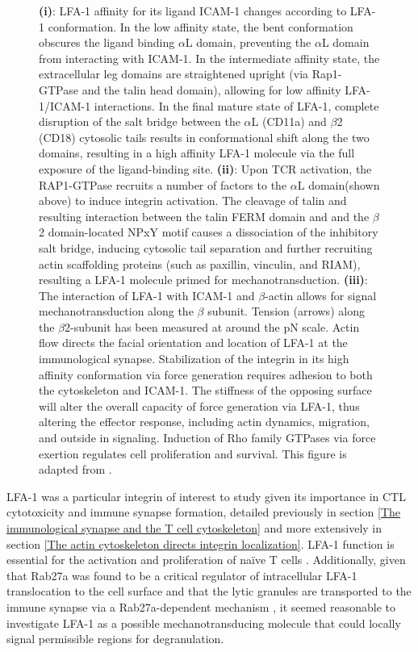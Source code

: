 \begin{figure}[htbp]
	\caption*{\textbf{(i)}: LFA-1 affinity for its ligand ICAM-1 changes according to LFA-1 conformation. In the low affinity state, the bent conformation obscures the ligand binding $\alpha$L domain, preventing the $\alpha$L domain from interacting with ICAM-1. In the intermediate affinity state, the extracellular leg domains are straightened upright (via Rap1-GTPase and the talin head domain), allowing for low affinity LFA-1/ICAM-1 interactions. In the final mature state of LFA-1, complete disruption of the salt bridge between the $\alpha$L (CD11a) and $\beta$2 (CD18) cytosolic tails results in conformational shift along the two domains, resulting in a high affinity LFA-1 molecule via the full exposure of the ligand-binding site. \textbf{(ii)}: Upon TCR activation, the RAP1-GTPase recruits a number of factors to the $\alpha$L domain(shown above) to induce integrin activation. The cleavage of talin and resulting interaction between the talin FERM domain and and the $\beta$2 domain-located NPxY motif causes a dissociation of the inhibitory salt bridge, inducing cytosolic tail separation and  further recruiting actin scaffolding proteins (such as paxillin, vinculin, and RIAM), resulting a LFA-1 molecule primed for mechanotransduction. \textbf{(iii)}: The interaction of LFA-1 with ICAM-1 and $\beta$-actin allows for signal mechanotransduction along the $\beta$ subunit. Tension (arrows) along the $\beta$2-subunit has been measured at around the pN scale. Actin flow directs the facial orientation and location of LFA-1 at the immunological synapse. Stabilization of the integrin in its high affinity conformation via force generation requires adhesion to both the cytoskeleton and ICAM-1. The stiffness of the opposing surface will alter the overall capacity of force generation via LFA-1, thus altering the effector response, including actin dynamics, migration, and outside in signaling. Induction of Rho family GTPases via force exertion regulates cell proliferation and survival. This figure is adapted from \cite{Walling2018}.}
	\label{fig:lfa}
\end{figure}

LFA-1 was a particular integrin of interest to study given its importance in CTL cytotoxicity and immune synapse formation, detailed previously in section \ref{The immunological synapse and the T cell cytoskeleton} and more extensively in section \ref{The actin cytoskeleton directs integrin localization}. LFA-1 function is essential for the activation and proliferation of na{\"i}ve T cells \cite{Wang2009, Capece2017}. Additionally, given that Rab27a was found to be a critical regulator of intracellular LFA-1 translocation to the cell surface \cite{Capece2017} and that the lytic granules are transported to the immune synapse via a Rab27a-dependent mechanism \cite{Kurowska2016}, it seemed reasonable to investigate LFA-1 as a possible mechanotransducing molecule that could locally signal permissible regions for degranulation.

